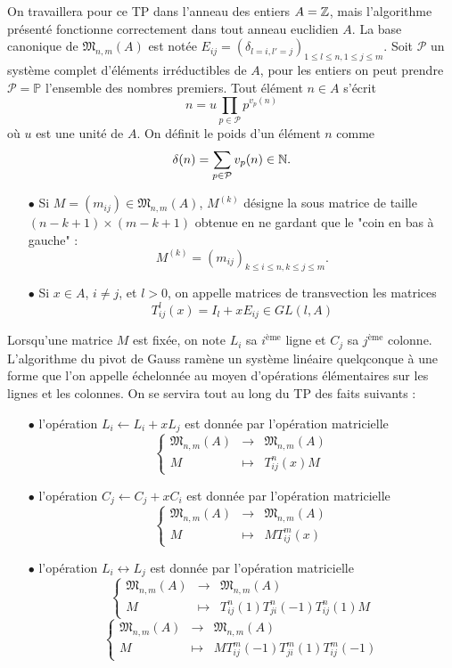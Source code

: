 On travaillera pour ce TP dans l'anneau des entiers $A=\mathbb Z$, mais l'algorithme présenté fonctionne correctement dans tout anneau euclidien $A$. La base canonique de $\mathfrak M_{n,m}(A)$ est notée $E_{ij}=(\delta_{l=i,l'=j})_{1\leq l\leq n,1\leq j\leq m}$. Soit $\mathcal P$ un système complet d'éléments irréductibles de $A$, pour les entiers on peut prendre $\mathcal P=\mathbb P$ l'ensemble des nombres premiers. Tout élément $n\in A$ s'écrit 
\[n=u\prod_{p\in\mathcal P} p^{v_p(n)}\]
où $u$ est une unité de $A$. On définit le poids d'un élément $n$ comme
\[\delta(n)=\sum_{p\in\mathcal P} v_p(n) \in \mathbb N.\]

\begin{itemize}
\item[$\bullet$] Si $M=(m_{ij})\in \mathfrak M_{n,m}(A)$, $M^{(k)}$ désigne la sous matrice de taille $(n-k+1)\times (m-k+1) $ obtenue en ne gardant que le "coin en bas à gauche" :
\[M^{(k)}=(m_{ij})_{k\leq i\leq n,k\leq j\leq m}.\]
\item[$\bullet$] Si $x\in A$, $i\neq j$, et $l>0$, on appelle matrices de transvection les matrices 
\[T_{ij}^l(x)=I_l + xE_{ij}\in GL(l,A)\]
\end{itemize}

Lorsqu'une matrice $M$ est fixée, on note $L_i$ sa $i^{\text{ème}}$ ligne et $C_j$ sa $j^{\text{ème}}$ colonne. L'algorithme du pivot de Gauss ramène un système linéaire quelqconque à une forme que l'on appelle échelonnée au moyen d'opérations élémentaires sur les lignes et les colonnes. On se servira tout au long du TP des faits suivants : \\

\begin{itemize}
\item[$\bullet$] l'opération $L_i\leftarrow L_i+xL_j$ est donnée par l'opération matricielle
\[\left\{\begin{array}{lll} \mathfrak M_{n,m}(A) & \rightarrow & \mathfrak M_{n,m}(A) \\ M & \mapsto& T_{ij}^n(x) M\end{array}\right.\]
\item[$\bullet$] l'opération $C_j\leftarrow C_j+xC_i$ est donnée par l'opération matricielle
\[\left\{\begin{array}{lll} \mathfrak M_{n,m}(A) & \rightarrow & \mathfrak M_{n,m}(A) \\ M & \mapsto & M T_{ij}^m(x)\end{array}\right.\]
\item[$\bullet$] l'opération $L_i\leftrightarrow L_j $ est donnée par l'opération matricielle
\[\left\{\begin{array}{lll} \mathfrak M_{n,m}(A) & \rightarrow & \mathfrak M_{n,m}(A) \\ M & \mapsto& T_{ij}^n(1)T_{ji}^n(-1)T_{ij}^n(1) M\end{array}\right.\]
\[\left\{\begin{array}{lll} \mathfrak M_{n,m}(A) & \rightarrow & \mathfrak M_{n,m}(A) \\ M & \mapsto& MT_{ij}^m(-1)T_{ji}^m(1)T_{ij}^m(-1) \end{array}\right.\]
\end{itemize}

